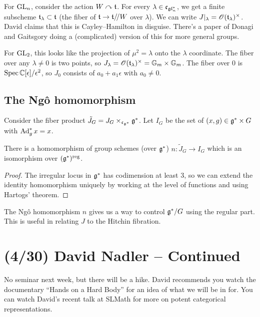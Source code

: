 \documentclass{article}
\begin{document}
\begin{ex}
  For $\operatorname{GL}_n$, consider the action $W \curvearrowright \mathfrak{t}$.
  For every $\lambda \in \mathfrak{c}_{\mathfrak{gl}_n^*}$, we get a finite subscheme $\mathfrak{t}_\lambda \subset \mathfrak{t}$ (the fiber of $\mathfrak{t} \to \mathfrak{t} /\mkern-3mu/ W$ over $\lambda$).
  We can write $J|_\lambda = \mathscr{O}(\mathfrak{t}_\lambda)^\times$.
  David claims that this is Cayley--Hamilton in disguise.
  There's a paper of Donagi and Gaitsgory doing a (complicated) version of this for more general groups.

  For $\operatorname{GL}_2$, this looks like the projection of $\mu^2 = \lambda$ onto the $\lambda$ coordinate.
  The fiber over any $\lambda \neq 0$ is two points, so $J_\lambda = \mathscr{O}(\mathfrak{t}_\lambda)^\times = \mathbb{G}_m \times \mathbb{G}_m$.
  The fiber over $0$ is $\operatorname{Spec} \mathbb{C}[\epsilon] / \epsilon^2$, so $J_0$ consists of $a_0 + a_1 \epsilon$ with $a_0 \neq 0$.
\end{ex}

\subsection{The Ng\^{o} homomorphism}

Consider the fiber product $\tilde{J}_G = J_G \times_{\mathfrak{c}_{\mathfrak{g}^*}} \mathfrak{g}^*$.
Let $I_G$ be the set of $(x, g) \in \mathfrak{g}^* \times G$ with $\operatorname{Ad}_g^* x = x$.

\begin{thm}
  There is a homomorphism of group schemes (over $\mathfrak{g}^*$) $n: \tilde{J}_G \to I_G$ which is an isomorphism over $(\mathfrak{g}^*)^{\mathrm{reg}}$.
\end{thm}

\begin{proof}
  The irregular locus in $\mathfrak{g}^*$ has codimension at least $3$, so we can extend the identity homomorphism uniquely by working at the level of functions and using Hartogs' theorem.
\end{proof}

The Ng\^{o} homomorphism $n$ gives us a way to control $\mathfrak{g}^* / G$ using the regular part.
This is useful in relating $J$ to the Hitchin fibration.

\section{(4/30) David Nadler -- Continued}

No seminar next week, but there will be a hike.
David recommends you watch the documentary ``Hands on a Hard Body'' for an idea of what we will be in for.
You can watch David's recent talk at SLMath for more on potent categorical representations.
\end{document}
